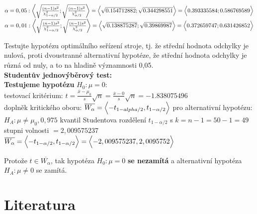 \documentclass[11pt,a4paper]{article}
\begin{document}
$ \alpha = 0,05 : \biggl< \sqrt{\frac{(n - 1) s^2}{\chi_{1-\alpha/2}^2}} ; \sqrt{\frac{(n - 1) s^2}{\chi_{\alpha/2}^2}} \biggr> = \Bigl< \sqrt{0.154712882} ; \sqrt{0.344298551} \Bigr> = \Bigl< 0.393335584  ; 0.586769589 \Bigr> $ \\

$ \alpha = 0,01 : \biggl< \sqrt{\frac{(n - 1) s^2}{\chi_{1-\alpha/2}^2}} ; \sqrt{\frac{(n - 1) s^2}{\chi_{\alpha/2}^2}} \biggr> = \Bigl< \sqrt{0.138875287} ; \sqrt{0.39869987} \Bigr> = \Bigl< 0.372659747 ; 0.631426852 \Bigr> $ \\

\noindent\makebox[\linewidth]{\rule{\textwidth}{0.4pt}}
\newpage

Testujte hypotézu optimálního seřízení stroje, tj. že střední hodnota odchylky je nulová, proti dvoustranné alternativní hypotéze, že střední hodnota odchylky je různá od nuly, a to na hladině významnosti 0,05. \\

\textbf{Studentův jednovýběrový test:} \\

\textbf{Testujeme hypotézu} $ H_0 : \mu = 0: $ \\

testovací kritérium: $ t = \frac{\overline{x} - \mu_0}{s} \sqrt{n} = \frac{\overline{x} - 0}{s} \sqrt{n} = -1.838075496$ \\

doplněk kritického oboru: $ \overline{W_\alpha} = \Bigl< -t_{1-alpha/2} , t_{1-\alpha/2} \Bigr> $ pro alternativní hypotézu: $ H_A : \mu \ne \mu_0, 0,975 $ kvantil Studentova rozdělení $ t_{1-\alpha/2} $ s $ k = n - 1 = 50 - 1 = 49 $ stupni volnosti $ = 2,009575237 $ \\

$ \overline{W_\alpha} = \Bigl< -t_{1-\alpha/2} , t_{1-\alpha/2} \Bigr> = \Bigl< -2,009575237, 2,0095752 \Bigr> $

Protože $ t \in \overline{W_\alpha} $, tak hypotéza $ H_0 : \mu = 0 $ \textbf{se nezamítá} a alternativní hypotéza $ H_A : \mu \ne 0 $ se zamítá.

\noindent\makebox[\linewidth]{\rule{\textwidth}{0.4pt}}





\newpage

\section{Literatura}

\begin{flushleft}
    
\end{flushleft}
\end{document}
